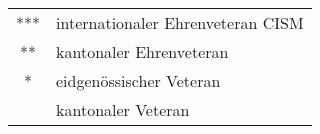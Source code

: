 \begin{history}
    \unvbox\veteranenbox
\end{history}

\begin{tabular}{ c l  }
    *** & internationaler Ehrenveteran CISM \\
    **  & kantonaler Ehrenveteran           \\
    *   & eidgenössischer Veteran           \\
        & kantonaler Veteran                \\
\end{tabular}
